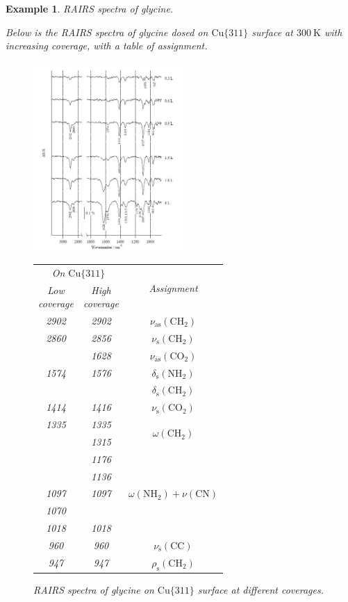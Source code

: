 \documentclass{article}
\theoremstyle{plain}\theoremheaderfont{\normalfont\itshape}\theorembodyfont{\rmfamily}\theoremseparator{.}\newtheorem*{rem}{Remark}\newtheorem*{ex}{Example}\newtheorem*{proof}{Proof}\newtheorem*{altp}{Alternative proof}
\theoremstyle{plain}\theoremheaderfont{\normalfont\bfseries}\theorembodyfont{\rmfamily}\theoremseparator{.}\newtheorem{thm}{Theorem}[section]\newtheorem{lem}[thm]{Lemma}\newtheorem{prop}[thm]{Proposition}\newtheorem*{cor}{Corollary}\newtheorem{defn}[thm]{Definition}\newtheorem{clm}[thm]{Claim}\newtheorem{clminproof}{Claim}\newtheorem*{law}{Law}\newtheorem{pos}[thm]{Postulate}
\theoremstyle{break}\theoremheaderfont{\normalfont\itshape}\theorembodyfont{\rmfamily}\theoremseparator{.\medskip}\newtheorem*{proofskip}{Proof}\newtheorem*{exs}{Examples}\newtheorem*{rems}{Remarks}
\theoremstyle{break}\theoremheaderfont{\normalfont\bfseries}\theorembodyfont{\rmfamily}\theoremseparator{.\medskip}\newtheorem{lemskip}[thm]{Lemma}\newtheorem{defnskip}[thm]{Definition}\newtheorem{propskip}[thm]{Proposition}\newtheorem{thmskip}[thm]{Theorem}
\numberwithin{equation}{section}
\newcommand{\unit}[1]{\ \mathrm{#1}}
\begin{document}
	\begin{ex}
		\textit{RAIRS spectra of glycine.}

		Below is the RAIRS spectra of glycine dosed on \(\mathrm{Cu}\{311\}\) surface at \(300\unit{K}\) with increasing coverage, with a table of assignment.

		\begin{figure}[ht!]
			\centering
			\includegraphics[width=0.51\textwidth]{RAIRS_Gly_Cu.jpg}
			\qquad
			\begin{tabular}[b]{ccc} \toprule
				\multicolumn{2}{c}{On \(\mathrm{Cu}\{311\}\)} & \multirow{2}{*}{Assignment} \\
				\makecell[l]{Low \\ coverage} & \makecell[l]{High \\ coverage} & ~ \\ \midrule
				2902 & 2902 & \(\nu_{\text{as}}(\mathrm{CH_2})\) \\\midrule
				2860 & 2856 & \(\nu_{\text{s}}(\mathrm{CH_2})\) \\\midrule
				~ & 1628 & \(\nu_{\text{as}}(\mathrm{CO_2})\) \\\midrule
				1574 & 1576 & \(\delta_{\text{s}}(\mathrm{NH_2})\) \\\midrule
				~ & ~ & \(\delta_{\text{s}}(\mathrm{CH_2})\) \\\midrule
				1414 & 1416 & \(\nu_{\text{s}}(\mathrm{CO_2})\) \\\midrule
				1335 & 1335 & \multirow{2}{*}{\(\omega(\mathrm{CH_2})\)} \\
				~ & 1315 & ~ \\\midrule
				~ & 1176 & \multirow{5}{*}{\(\omega(\mathrm{NH_2})+\nu(\mathrm{CN})\)} \\
				~ & 1136 & ~ \\
				1097 & 1097 & ~ \\
				1070 & ~ & ~ \\
				1018 & 1018 & ~ \\\midrule
				960 & 960 & \(\nu_{\text{s}}(\mathrm{CC})\) \\\midrule
				947 & 947 & \(\rho_{\text{s}}(\mathrm{CH_2})\) \\ \bottomrule
			\end{tabular}
			\caption{RAIRS spectra of glycine on \(\mathrm{Cu}\{311\}\) surface at different coverages.}
		\end{figure}


\end{ex}
\end{document}
